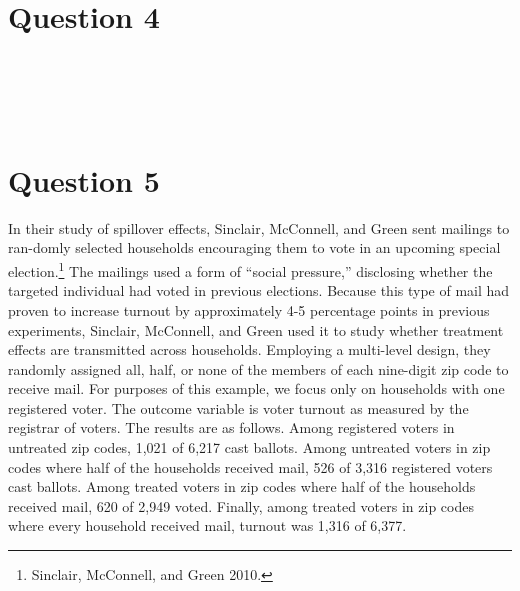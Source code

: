 \documentclass[11pt,notitlepage]{article}\usepackage[]{graphicx}\usepackage[]{color}
\makeatletter
\newenvironment{kframe}{%
 \def\at@end@of@kframe{}%
 \ifinner\ifhmode%
  \def\at@end@of@kframe{\end{minipage}}%
  \begin{minipage}{\columnwidth}%
 \fi\fi%
 \def\FrameCommand##1{\hskip\@totalleftmargin \hskip-\fboxsep
 \colorbox{shadecolor}{##1}\hskip-\fboxsep
     \hskip-\linewidth \hskip-\@totalleftmargin \hskip\columnwidth}%
 \MakeFramed {\advance\hsize-\width
   \@totalleftmargin\z@ \linewidth\hsize
   \@setminipage}}%
 {\par\unskip\endMakeFramed%
 \at@end@of@kframe}
\newenvironment{knitrout}{}{} %
\makeatother
\begin{document}
\section*{Question 4}
\begin{knitrout}
\color{fgcolor}\begin{kframe}
\begin{verbatim}





\end{verbatim}
\end{kframe}
\end{knitrout}

\section*{Question 5}
In their study of spillover effects, Sinclair, McConnell, and Green sent mailings to ran-domly selected households encouraging them to vote in an upcoming special election.\footnote{Sinclair, McConnell, and Green 2010.} The mailings used a form of ``social pressure,'' disclosing whether the targeted individual had voted in previous elections. Because this type of mail had proven to increase turnout by approximately 4-5 percentage points in previous experiments, Sinclair, McConnell, and Green used it to study whether treatment effects are transmitted across households. Employing a multi-level design, they randomly assigned all, half, or none of the members of each nine-digit zip code to receive mail. For purposes of this example, we focus only on households with one registered voter. The outcome variable is voter turnout as measured by the registrar of voters. The results are as follows. Among registered voters in untreated zip codes, 1,021 of 6,217 cast ballots. Among untreated voters in zip codes where half of the households received mail, 526 of 3,316 registered voters cast ballots. Among treated voters in zip codes where half of the households received mail, 620 of 2,949 voted. Finally, among treated voters in zip codes where every household received mail, turnout was 1,316 of 6,377.
\end{document}
